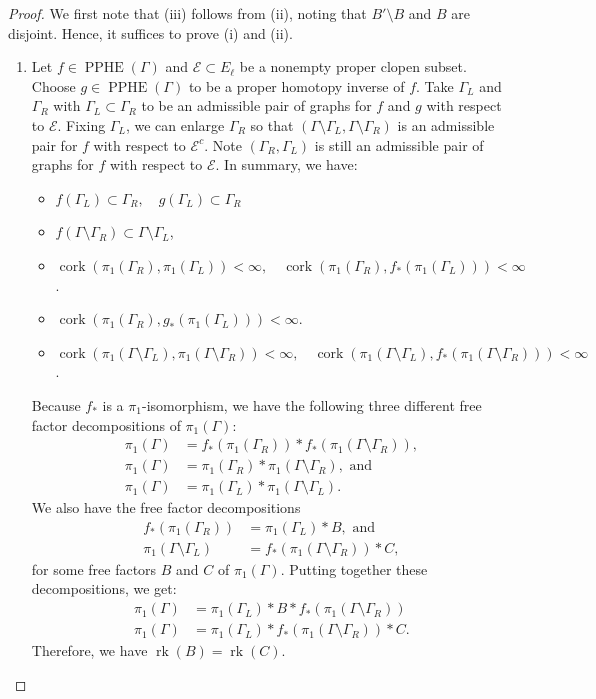 \documentclass[11pt]{amsart}
\theoremstyle{plain}
\theoremstyle{definition}
\DeclareMathOperator{\PPHE}{PPHE}
\DeclareMathOperator{\rk}{rk}
\DeclareMathOperator{\cork}{cork}
\newcommand{\cE}{\mathcal{E}}
\def\G{{\Gamma}}
\newcommand{\<}{\langle}
\renewcommand{\>}{\rangle}
\begin{document}
\begin{proof}
    We first note that (iii) follows from (ii), noting that $B' \setminus B$ and $B$ are disjoint. Hence, it suffices to prove (i) and (ii).
    \begin{enumerate}[label=(\roman*)]
        \item Let $f \in \PPHE(\G)$ and $\cE \subset E_\ell$ be a nonempty proper clopen subset. Choose $g \in \PPHE(\G)$ to be a proper homotopy inverse of $f$. 
    Take $\G_L$ and $\G_R$ with $\G_L \subset \G_R$ to be an admissible pair of graphs for $f$ and $g$ with respect to $\cE.$
    Fixing $\G_L$, we can enlarge $\G_R$ so that $(\G \setminus \G_L, \G \setminus \G_R)$ is an admissible pair for $f$ with respect to $\cE^c$. Note $(\G_R, \G_L)$ is still an admissible pair of graphs for $f$ with respect to $\cE$. In summary, we have:
    \begin{itemize}
        \item $f(\G_L) \subset \G_R, \quad g(\G_L) \subset \G_R$
        \item $f(\G \setminus \G_R) \subset \G \setminus \G_L$,
        \item $\cork(\pi_1(\G_R), \pi_1(\G_L))<\infty, \quad \cork(\pi_1(\G_R), f_*(\pi_1(\G_L))) < \infty$.
        \item $\cork(\pi_1(\G_R), g_*(\pi_1(\G_L))) < \infty$.
        \item $\cork(\pi_1(\G \setminus \G_L), \pi_1(\G \setminus \G_R))<\infty, \quad \cork(\pi_1(\G \setminus \G_L), f_*(\pi_1(\G \setminus \G_R))) < \infty$.
    \end{itemize}
    Because $f_*$ is a $\pi_1$-isomorphism, we have the following three different free factor decompositions of $\pi_{1}(\G)$:
    \begin{align*}
        \pi_{1}(\G) &= f_*(\pi_1(\G_R)) \ast f_*(\pi_1(\G \setminus \G_R)), \\
        \pi_{1}(\G) &= \pi_1(\G_R) \ast \pi_1(\G \setminus \G_R), \text{ and} \\
        \pi_{1}(\G) &= \pi_1(\G_L) \ast \pi_1(\G \setminus \G_L).
    \end{align*}
    We also have the free factor decompositions
    \begin{align*}
        f_{*}(\pi_{1}(\G_{R})) &= \pi_{1}(\G_{L}) \ast B, \text{ and}\\
        \pi_{1}(\G\setminus\G_{L}) &= f_{*}(\pi_1(\G\setminus\G_{R})) \ast C,
    \end{align*}
    for some free factors $B$ and $C$ of $\pi_1(\G)$. Putting together these decompositions, we get:
    \begin{align*}
    \pi_{1}(\G) &= \pi_{1}(\G_{L}) \ast B \ast f_*(\pi_1(\G \setminus \G_R)) \\
    \pi_{1}(\G) &= \pi_1(\G_L) \ast f_{*}(\pi_1(\G\setminus\G_{R})) \ast C.
    \end{align*}
    Therefore, we have $\rk(B)=\rk(C)$.
    

\end{enumerate}
\end{proof}
\end{document}
